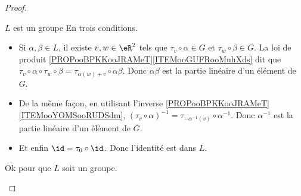 \begin{proof}
\begin{subproof}
        \item[\( L\) est un groupe]
            En trois conditions.
            \begin{itemize}
                \item 
                    Si \( \alpha,\beta\in L\), il existe \( v,w\in \eR^2\) tels que \( \tau_v\circ \alpha\in G\) et \( \tau_w\circ \beta\in G\). La loi de produit \ref{PROPooBPKKooJRAMeT}\ref{ITEMooGUFRooMuhXds} dit que \( \tau_v\circ \alpha\circ\tau_w\circ \beta=\tau_{\alpha(w)+v}\circ \alpha\beta\). Donc \( \alpha\beta\) est la partie linéaire d'un élément de \( G\). 
                \item
                    De la même façon, en utilisant l'inverse \ref{PROPooBPKKooJRAMeT}\ref{ITEMooYOMSooRUDSdm}, \( (\tau_v\circ\alpha)^{-1}= \tau_{-\alpha^{-1}(v)}\circ \alpha^{-1}   \). Donc \( \alpha^{-1}\) est la partie linéaire d'un élément de \( G\).
                \item
                    Et enfin \( \id=\tau_0\circ \id\). Donc l'identité est dans \( L\).
            \end{itemize}
            Ok pour que \( L\) soit un groupe.


\end{subproof}
\end{proof}
